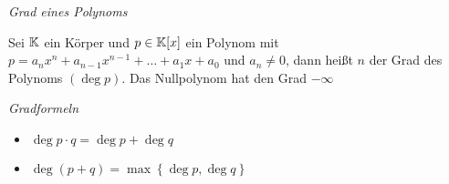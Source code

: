 
\begin{mydef}\textit{Grad eines Polynoms}

    Sei $\mathbb{K}$ ein Körper und $p \in \mathbb{K}[x]$ ein Polynom mit $p = a_n x^n + a_{n-1} x^{n-1} + \ldots + a_1 x + a_0$ und $a_n \neq 0$, dann heißt $n$ der Grad des Polynoms $(\deg p)$. Das Nullpolynom hat den Grad $-\infty$
\end{mydef}

\begin{mylemma}\label{gradformeln} \textit{Gradformeln}
    \begin{itemize}
        \item $\deg p \cdot q = \deg p + \deg q$
        \item $\deg(p + q) = \max \left\{ \deg p, \deg q \right\}$
    \end{itemize}
\end{mylemma}

